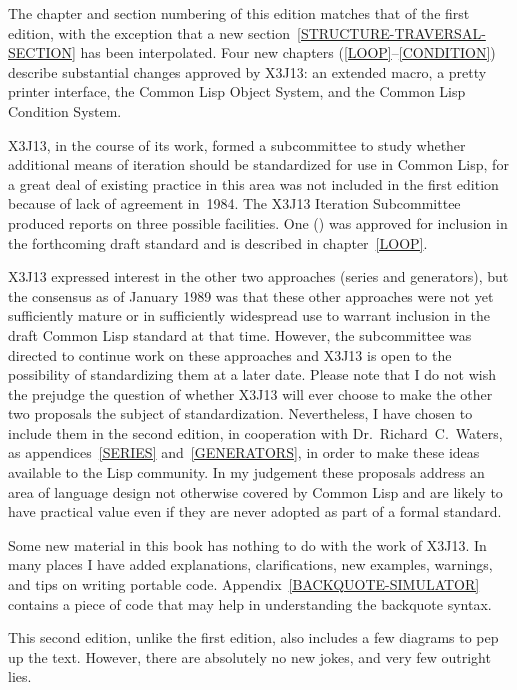 The chapter and section numbering of this edition matches that
of the first edition, with the exception that a new
section~\ref{STRUCTURE-TRAVERSAL-SECTION}
has been interpolated.
Four new chapters (\ref{LOOP}--\ref{CONDITION})
describe substantial changes approved by X3J13: an extended
 macro, a pretty printer interface, the Common Lisp
Object System, and the Common Lisp Condition System.

X3J13, in the course of its work, formed a subcommittee to study
whether additional means of iteration
should be standardized for use in Common Lisp, for a great
deal of existing practice in this area was not included in the
first edition because of lack of agreement in~1984.
The X3J13 Iteration Subcommittee produced reports on three possible facilities.
One () was approved for inclusion in the forthcoming draft standard
and is described in chapter~\ref{LOOP}.

X3J13 expressed interest in the other two approaches (series and generators),
but the consensus as of January 1989
was that these other approaches were not yet sufficiently mature or
in sufficiently widespread use to warrant inclusion in the draft Common Lisp
standard at that time.  However, the subcommittee was directed to continue work
on these approaches and X3J13 is open to the possibility of standardizing
them at a later date.
Please note that I do not wish the prejudge the
question of whether X3J13 will ever choose to make the other two proposals the
subject of standardization.  Nevertheless,
I have chosen to include them in the second edition,
in cooperation with Dr.~Richard~C.~Waters,
as appendices~\ref{SERIES} and~\ref{GENERATORS},
in order to make these ideas
available to the Lisp community.  In my judgement these proposals
address an area of language design not otherwise covered by Common Lisp
and are likely to have practical value even if they are never
adopted as part of a formal standard.

Some new material in this book has nothing to do with the work of X3J13.
In many places I have added explanations, clarifications, new examples,
warnings, and tips on writing portable code.
Appendix~\ref{BACKQUOTE-SIMULATOR} contains a piece of code
that may help in understanding the backquote syntax.

This second edition,
unlike the first edition, also includes a few diagrams to pep up the text.
However, there are absolutely no new jokes, and very few outright lies.


\chapter*{}


